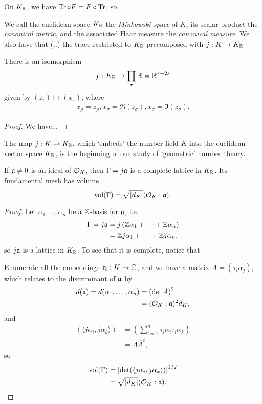On $K_{\mathbb{R}}$, we have $\operatorname{Tr}\circ F = F\circ\operatorname{Tr}$, so 

We call the euclidean space $K_{\mathbb{R}}$ the \emph{Minkowski space} of $K$, its scalar product the \emph{canonical metric}, and the associated Haar measure the \emph{canonical measure}. We also have that (..) the trace restricted to $K_{\mathbb{R}}$ precomposed with $j:K\to K_{\mathbb{R}}$




\begin{proposition}
	There is an isomorphism
	\[
		f : K_{\mathbb{R}} \to \prod_\tau \mathbb{R} = \mathbb{R}^{r+2s}
	\]
	given by $(z_\tau)\mapsto(x_\tau)$, where
	\begin{align*}
		x_\rho = z_\rho, x_\sigma = \Re(z_\sigma), x_{\overline{\sigma}} = \Im(z_\sigma).
	\end{align*}
\end{proposition}
\begin{proof}
	We have...
\end{proof}


The map $j:K\to K_{\mathbb{R}}$, which `embeds' the number field $K$ into the euclidean vector space $K_{\mathbb{R}}$, is the beginning of our study of `geometric' number theory.

\begin{proposition}
	If $\mathfrak{a}\neq 0$ is an ideal of $\mathcal{O}_K$, then $\Gamma=j\mathfrak{a}$ is a complete lattice in $K_{\mathbb{R}}$. Its fundamental mesh has volume
	\[
		\operatorname{vol}(\Gamma) = \sqrt{|d_K|}(\mathcal{O}_K:\mathfrak{a}).
	\]
\end{proposition}
\begin{proof}
	Let $\alpha_1,\dots,\alpha_n$ be a $\mathbb{Z}$-basis for $\mathfrak{a}$, i.e.
	\begin{align*}
		\Gamma = j\mathfrak{a} &= j\left(\mathbb{Z}\alpha_1+\cdots+\mathbb{Z}\alpha_n\right)\\
			&= \mathbb{Z} j\alpha_1 + \cdots + \mathbb{Z} j\alpha_n,
	\end{align*}
	so $j\mathfrak{a}$ is a lattice in $K_{\mathbb{R}}$. To see that it is complete, notice that

	Enumerate all the embeddings $\tau_i:K\to\mathbb{C}$, and we have a matrix $A=(\tau_i\alpha_j)$, which relates to the discriminant of $\mathfrak{a}$ by
	\begin{align*}
		d(\mathfrak{a}) = d(\alpha_1,\dots,\alpha_n) &= (\det A)^2\\
			&= (\mathcal{O}_K:\mathfrak{a})^2 d_K,
	\end{align*}
	and
	\begin{align*}
		(\langle j\alpha_i, j\alpha_k\rangle) &= (\sum_{l=1}^n \tau_l\alpha_i \overline{\tau}_l\alpha_k)\\
			&= A\overline{A}^t,
	\end{align*}
	so 
	\begin{align*}
		\operatorname{vol}(\Gamma) &= \left|\det(\langle j\alpha_i,j\alpha_k\rangle)\right|^{1/2}\\
			&= \sqrt{|d_K|}(\mathcal{O}_K:\mathfrak{a}).
	\end{align*}
\end{proof}

